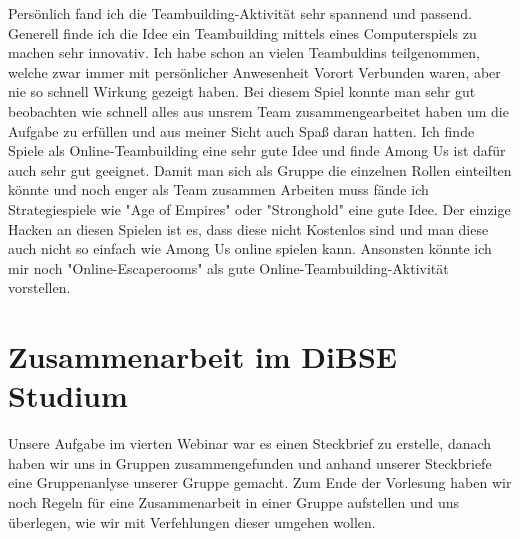 \documentclass[12pt]{article}
\begin{document}
Persönlich fand ich die Teambuilding-Aktivität sehr spannend und passend. Generell finde ich die Idee ein Teambuilding mittels eines Computerspiels zu machen sehr innovativ. Ich habe schon an vielen Teambuldins teilgenommen, welche zwar immer mit persönlicher Anwesenheit Vorort Verbunden waren, aber nie so schnell Wirkung gezeigt haben. Bei diesem Spiel konnte man sehr gut beobachten wie schnell alles aus unsrem Team zusammengearbeitet haben um die Aufgabe zu erfüllen und aus meiner Sicht auch Spaß daran hatten. Ich finde Spiele als Online-Teambuilding eine sehr gute Idee und finde Among Us ist dafür auch sehr gut geeignet. Damit man sich als Gruppe die einzelnen Rollen einteilten könnte und noch enger als Team zusammen Arbeiten muss fände ich Strategiespiele wie "Age of Empires" oder "Stronghold" eine gute Idee. Der einzige Hacken an diesen Spielen ist es, dass diese nicht Kostenlos sind und man diese auch nicht so einfach wie Among Us online spielen kann. Ansonsten könnte ich mir noch "Online-Escaperooms" als gute Online-Teambuilding-Aktivität vorstellen.
\section{Zusammenarbeit im DiBSE Studium}
Unsere Aufgabe im vierten Webinar war es einen Steckbrief zu erstelle, danach haben wir uns in Gruppen zusammengefunden und anhand unserer Steckbriefe eine Gruppenanlyse unserer Gruppe gemacht. Zum Ende der Vorlesung haben wir noch Regeln für eine Zusammenarbeit in einer Gruppe aufstellen und uns überlegen, wie wir mit Verfehlungen dieser umgehen wollen.
\end{document}
